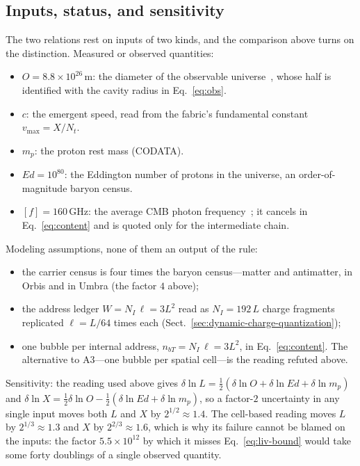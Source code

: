 \documentclass[a4paper]{article}
\begin{document}
\subsection{Inputs, status, and sensitivity}\label{subsec:appendixA-sensitivity}
The two relations rest on inputs of two kinds, and the comparison above turns on the distinction.  Measured or observed quantities:
\begin{itemize}
\item[H1] $O=8.8\times10^{26}$\,m: the diameter of the observable universe~\cite{halpbern}, whose half is identified with the cavity radius in Eq.~\eqref{eq:obs}.
\item[H2] $c$: the emergent speed, read from the fabric's fundamental constant $v_{\max}=X/N_t$.
\item[H3] $m_{p}$: the proton rest mass (CODATA).
\item[H4] $Ed=10^{80}$: the Eddington number of protons in the universe, an order-of-magnitude baryon census.
\item[H5] $[f]=160$\,GHz: the average CMB photon frequency~\cite{archeops}; it cancels in Eq.~\eqref{eq:content} and is quoted only for the intermediate chain.
\end{itemize}
Modeling assumptions, none of them an output of the rule:
\begin{itemize}
\item[A1] the carrier census is four times the baryon census---matter and antimatter, in Orbis and in Umbra (the factor $4$ above);
\item[A2] the address ledger $W=N_I\,\ell=3L^{2}$ read as $N_I=192\,L$ charge fragments replicated $\ell=L/64$ times each (Sect.~\ref{sec:dynamic-charge-quantization});
\item[A3] one bubble per internal address, $n_{bT}=N_I\,\ell=3L^{2}$, in Eq.~\eqref{eq:content}.  The alternative to A3---one bubble per spatial cell---is the reading refuted above.
\end{itemize}
Sensitivity: the reading used above gives $\delta\ln L=\tfrac{1}{2}(\delta\ln O+\delta\ln Ed+\delta\ln m_{p})$ and $\delta\ln X=\tfrac{1}{2}\delta\ln O-\tfrac{1}{2}(\delta\ln Ed+\delta\ln m_{p})$, so a factor-$2$ uncertainty in any single input moves both $L$ and $X$ by $2^{1/2}\approx1.4$.  The cell-based reading moves $L$ by $2^{1/3}\approx1.3$ and $X$ by $2^{2/3}\approx1.6$, which is why its failure cannot be blamed on the inputs: the factor $5.5\times10^{12}$ by which it misses Eq.~\eqref{eq:liv-bound} would take some forty doublings of a single observed quantity.
\end{document}
